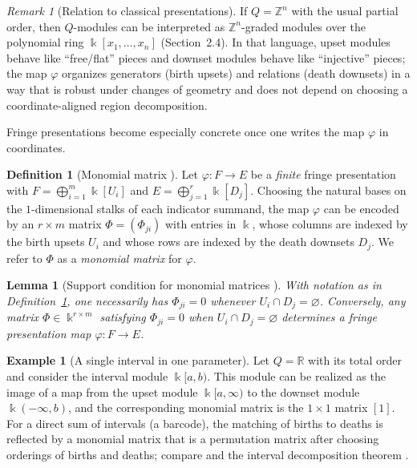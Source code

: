 \documentclass{article}
\newcommand{\kk}{\Bbbk}
\newcommand{\<}{\langle}
\renewcommand{\>}{\rangle}
\newcommand{\bbb}[1]{\ensuremath{\mathbb{#1}}}
\newtheorem{lemma}[theorem]{Lemma}
\theoremstyle{definition}
\newtheorem{defn}[theorem]{Definition}
\newtheorem{example}[theorem]{Example}
\theoremstyle{remark}
\newtheorem*{remark}{Remark}
\begin{document}
	\begin{remark}[Relation to classical presentations]
		\label{rem:fringe-as-presentation}
		If $Q=\bbb{Z}^n$ with the usual partial order, then $Q$-modules can be interpreted as
		$\bbb{Z}^n$-graded modules over the polynomial ring $\kk[x_1,\dots,x_n]$ (Section~2.4).
		In that language, upset modules behave like ``free/flat'' pieces and downset modules
		behave like ``injective'' pieces; the map $\varphi$ organizes generators (birth upsets)
		and relations (death downsets) in a way that is robust under changes of geometry and
		does not depend on choosing a coordinate-aligned region decomposition.
	\end{remark}
	
	Fringe presentations become especially concrete once one writes the map $\varphi$ in
	coordinates.
	
	\begin{defn}[Monomial matrix {\cite[Def.~3.17]{Mil20}}]
		\label{def:monomial-matrix}
		Let $\varphi\colon F\to E$ be a \emph{finite} fringe presentation with
		$F=\bigoplus_{i=1}^{m}\kk[U_i]$ and $E=\bigoplus_{j=1}^{r}\kk[D_j]$.
		Choosing the natural bases on the $1$-dimensional stalks of each indicator summand,
		the map $\varphi$ can be encoded by an $r\times m$ matrix $\Phi=(\Phi_{j i})$ with
		entries in $\kk$, whose columns are indexed by the birth upsets $U_i$ and whose rows
		are indexed by the death downsets $D_j$.  We refer to $\Phi$ as a \emph{monomial matrix}
		for $\varphi$.
	\end{defn}
	
	\begin{lemma}[Support condition for monomial matrices {\cite[Prop.~3.18]{Mil20}}]
		\label{lem:monomial-support}
		With notation as in Definition~\ref{def:monomial-matrix}, one necessarily has
		$\Phi_{j i}=0$ whenever $U_i\cap D_j=\varnothing$.  Conversely, any matrix
		$\Phi\in \kk^{r\times m}$ satisfying $\Phi_{j i}=0$ when $U_i\cap D_j=\varnothing$
		determines a fringe presentation map $\varphi\colon F\to E$.
	\end{lemma}
	
	\begin{example}[A single interval in one parameter]
		\label{ex:interval-fringe}
		Let $Q=\bbb{R}$ with its total order and consider the interval module $\kk[a,b)$.
		This module can be realized as the image of a map from the upset module $\kk[a,\infty)$
		to the downset module $\kk(-\infty,b)$, and the corresponding monomial matrix is the
		$1\times 1$ matrix $[1]$.  For a direct sum of intervals (a barcode), the matching of
		births to deaths is reflected by a monomial matrix that is a permutation matrix after
		choosing orderings of births and deaths; compare \cite[Ex.~3.19]{Mil20} and the
		interval decomposition theorem \cite{CB15}.
	\end{example}
	
\end{document}
